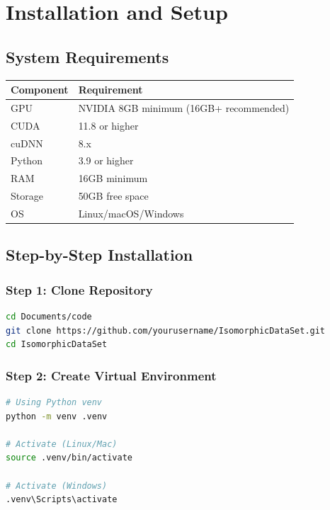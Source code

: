 \documentclass[12pt,a4paper,oneside]{report}
\begin{document}
\clearpage
\chapter{Installation and Setup}

\section{System Requirements}

\begin{table}[H]
\centering
\begin{tabular}{|l|p{6cm}|}
\hline
\textbf{Component} & \textbf{Requirement} \\
\hline
GPU & NVIDIA 8GB minimum (16GB+ recommended) \\
\hline
CUDA & 11.8 or higher \\
\hline
cuDNN & 8.x \\
\hline
Python & 3.9 or higher \\
\hline
RAM & 16GB minimum \\
\hline
Storage & 50GB free space \\
\hline
OS & Linux/macOS/Windows \\
\hline
\end{tabular}
\end{table}

\section{Step-by-Step Installation}

\subsection{Step 1: Clone Repository}

\begin{lstlisting}[language=Bash]
cd Documents/code
git clone https://github.com/yourusername/IsomorphicDataSet.git
cd IsomorphicDataSet
\end{lstlisting}

\subsection{Step 2: Create Virtual Environment}

\begin{lstlisting}[language=Bash]
# Using Python venv
python -m venv .venv

# Activate (Linux/Mac)
source .venv/bin/activate

# Activate (Windows)
.venv\Scripts\activate
\end{lstlisting}
\end{document}
